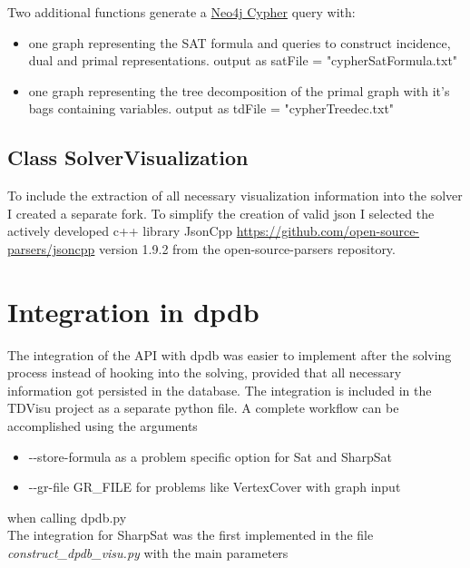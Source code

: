 \documentclass[a4paper, 12pt, bibliography=totoc]{scrartcl}
\begin{document}
Two additional functions generate a \href{https://neo4j.com/docs/cypher-refcard/current/}{Neo4j Cypher} query with:
\begin{itemize}
	\item one graph representing the SAT formula and  queries to construct incidence, dual and primal representations.
	output as satFile = "cypherSatFormula.txt"
	\item one graph representing the tree decomposition of the primal graph with it's bags containing variables.
	output as tdFile = "cypherTreedec.txt"
\end{itemize}

\subsection{Class SolverVisualization}

To include the extraction of all necessary visualization information into the solver I created a separate fork.
To simplify the creation of valid json I selected the actively developed c++ library JsonCpp \url{https://github.com/open-source-parsers/jsoncpp} version 1.9.2 from the open-source-parsers repository.

\newpage
\section{Integration in dpdb}
The integration of the API with dpdb was easier to implement after the solving process instead of
hooking into the solving, 
provided that all necessary information got persisted in the database.
The integration is included in the TDVisu project as a separate python file.
A complete workflow can be accomplished using the arguments
\begin{itemize}
	\item -{}-store-formula as a problem specific option for Sat and SharpSat
	\item -{}-gr-file GR\_FILE for problems like VertexCover with graph input 
\end{itemize}
when calling dpdb.py\\
The integration for SharpSat was the first implemented in the file \textit{construct\_dpdb\_visu.py} with
the main parameters
\end{document}
